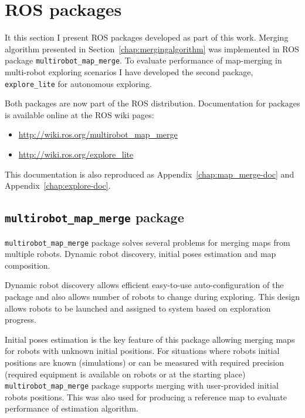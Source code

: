 \chapter{ROS packages}
\label{chap:ros-packages}

It this section I present \gls{ROS} packages developed as part of this work. Merging algorithm presented in Section~\ref{chap:mergingalgorithm} was implemented in \gls{ROS} package \texttt{multirobot\_map\_merge}. To evaluate performance of map-merging in multi-robot exploring scenarios I have developed the second package, \texttt{explore\_lite} for autonomous exploring.

Both packages are now part of the \gls{ROS} distribution. Documentation for packages is available online at the \gls{ROS} wiki pages:

\begin{itemize}
	\item \url{http://wiki.ros.org/multirobot_map_merge}
	\item \url{http://wiki.ros.org/explore_lite}
\end{itemize}

This documentation is also reproduced as Appendix~\ref{chap:map_merge-doc} and Appendix~\ref{chap:explore-doc}.

\section{\texttt{multirobot\_map\_merge} package} %
\label{sec:map_merge-package}

\texttt{multirobot\_map\_merge} package solves several problems for merging maps from multiple robots. Dynamic robot discovery, initial poses estimation and map composition.

Dynamic robot discovery allows efficient easy-to-use auto-configuration of the package and also allows number of robots to change during exploring. This design allows robots to be launched and assigned to system based on exploration progress.

Initial poses estimation is the key feature of this package allowing merging maps for robots with unknown initial positions. For situations where robots initial positions are known (simulations) or can be measured with required precision (required equipment is available on robots or at the starting place) \texttt{multirobot\_map\_merge} package supports merging with user-provided initial robots positions. This was also used for producing a reference map to evaluate performance of estimation algorithm.

